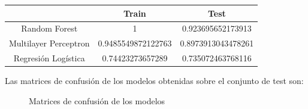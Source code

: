\documentclass[a4]{article}
\begin{document}
\begin{center}
\begin{tabular}{|c|c|c|}
  \hline
  \multicolumn{1}{|c|}{}& \textbf{Train} & \textbf{Test}  \\ \hline
  Random Forest         & 1                  & 0.923695652173913 \\
  Multilayer Perceptron & 0.9485549872122763 & 0.8973913043478261 \\
  Regresión Logística   & 0.74423273657289 & 0.735072463768116 \\\hline
\end{tabular}
\end{center}

Las matrices de confusión de los modelos obtenidas sobre el conjunto
de test son:
\vspace{-4mm}
\begin{figure}[H]
  \centering
  \caption{Matrices de confusión de los modelos}
  \label{fig:Confussion Matrix}
\end{figure}
\vspace{-4mm}
\end{document}
